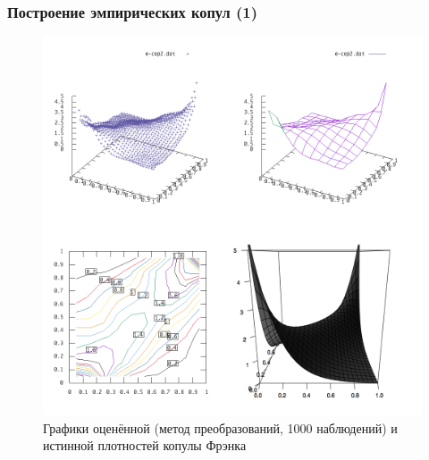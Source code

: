 \documentclass[11pt]{beamer}
\begin{document}
\begin{frame}
\begin{center}
\frametitle{Построение эмпирических копул (1)}
\begin{figure}[H]
  \centering
  \includegraphics[width=.56\textwidth]{FrankTransform.png}
  \caption{Графики оценённой (метод преобразований, 1000 наблюдений) и истинной плотностей копулы Фрэнка}
\end{figure}
\end{center}
\end{frame}
\end{document}
